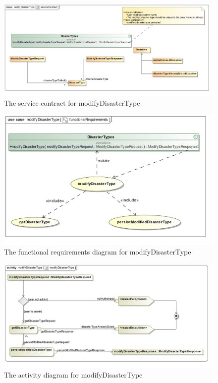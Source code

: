 \begin{figure}[H]
	\centering
	\includegraphics[scale=0.17]{../images/funcReq/modifyDisasterTypeServiceContract.jpg}
	\caption{The service contract for modifyDisasterType \label{overflow}}
\end{figure}

\begin{figure}[H]
	\centering
	\includegraphics[width=1.2\textwidth]{../images/funcReq/modifyDisasterTypeFunctionalRequirements.jpg}
	\caption{The functional requirements diagram for modifyDisasterType \label{overflow}}
\end{figure}

\begin{figure}[H]
	\centering
	\includegraphics[scale=0.2]{../images/funcReq/modifyDisasterTypeActivityDiagram.jpg}
	\caption{The activity diagram for modifyDisasterType \label{overflow}}
\end{figure}